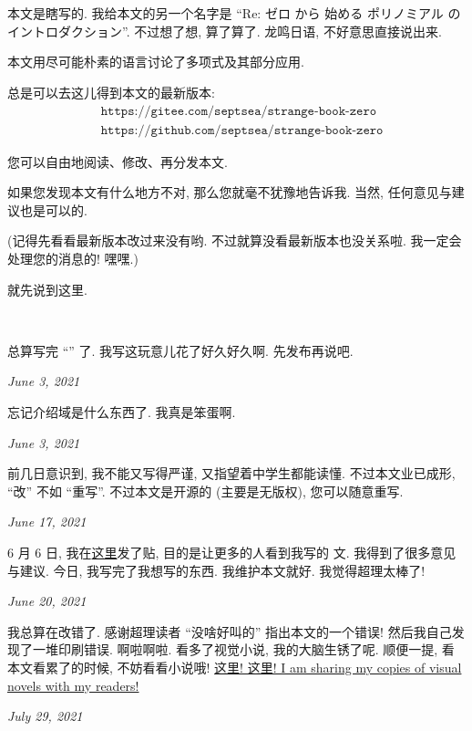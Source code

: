 \section*{\Preface}

本文是瞎写的. 我给本文的另一个名字是 ``Re: ゼロ から 始める ポリノミアル の イントロダクション''. 不过想了想, 算了算了. 龙鸣日语, 不好意思直接说出来.

本文用尽可能朴素的语言讨论了多项式及其部分应用.

总是可以去这儿得到本文的最新版本:
\begin{align*}
     & \texttt{https://gitee.com/septsea/strange-book-zero}  \\
     & \texttt{https://github.com/septsea/strange-book-zero}
\end{align*}

您可以自由地阅读、修改、再分发本文.

如果您发现本文有什么地方不对, 那么您就毫不犹豫地告诉我. 当然, 任何意见与建议也是可以的.

(记得先看看最新版本改过来没有哟. 不过就算没看最新版本也没关系啦. 我一定会处理您的消息的! 嘿嘿.)

就先说到这里.

\ \

\providecommand{\appendDate}{}
\renewcommand{\appendDate}[1]{\par \hfill {\itshape \sffamily #1}}

\begin{remark}
    总算写完 ``\Prerequisites '' 了. 我写这玩意儿花了好久好久啊. 先发布再说吧.
    \appendDate{June 3, 2021}
\end{remark}

\begin{remark}
    忘记介绍域是什么东西了. 我真是笨蛋啊.
    \appendDate{June 3, 2021}
\end{remark}

\begin{remark}
    前几日意识到, 我不能又写得严谨, 又指望着中学生都能读懂. 不过本文业已成形, ``改'' 不如 ``重写''. 不过本文是开源的 (主要是无版权), 您可以随意重写.
    \appendDate{June 17, 2021}
\end{remark}

\begin{remark}
    6 月 6 日, 我在\hyperref{https://chaoli.club/index.php/6396}{}{}{这里}发了贴, 目的是让更多的人看到我写的  文. 我得到了很多意见与建议. 今日, 我写完了我想写的东西. 我维护本文就好. 我觉得超理太棒了!
    \appendDate{June 20, 2021}
\end{remark}

\begin{remark}
    我总算在改错了. 感谢超理读者 ``没啥好叫的'' 指出本文的一个错误! 然后我自己发现了一堆印刷错误. 啊啦啊啦. 看多了视觉小说, 我的大脑生锈了呢. 顺便一提, 看本文看累了的时候, 不妨看看小说哦! \hyperref{https://gitee.com/septsea/ss}{}{}{这里! 这里! I am sharing my copies of visual novels with my readers!}
    \appendDate{July 29, 2021}
\end{remark}
